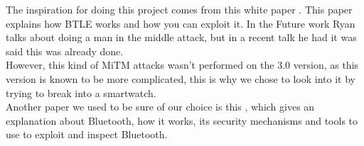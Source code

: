 The inspiration for doing this project comes from this white paper \cite{mryan2014ble}. This paper explains how BTLE works and how you can exploit it. In the Future work Ryan talks about doing a man in the middle attack, but in a recent talk he had \cite{hitbox_mike_ryan} it was said this was already done. \\
However, this kind of MiTM attacks wasn't performed on the 3.0 version, as this version is known to be more complicated, this is why we chose to look into it by trying to break into a smartwatch.\\
Another paper we used to be sure of our choice is this \cite{chai20126}, which gives an explanation about Bluetooth, how it works, its security mechanisms and tools to use to exploit and inspect Bluetooth. 